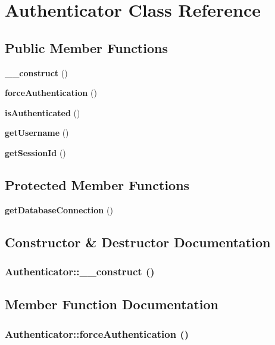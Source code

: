 \section{Authenticator Class Reference}
\label{classAuthenticator}
\subsection*{Public Member Functions}
\begin{CompactItemize}
\item 
{\bf \_\-\_\-construct} ()
\item 
{\bf forceAuthentication} ()
\item 
{\bf isAuthenticated} ()
\item 
{\bf getUsername} ()
\item 
{\bf getSessionId} ()
\end{CompactItemize}
\subsection*{Protected Member Functions}
\begin{CompactItemize}
\item 
{\bf getDatabaseConnection} ()
\end{CompactItemize}


\subsection{Constructor \& Destructor Documentation}
\subsubsection{\setlength{\rightskip}{0pt plus 5cm}Authenticator::\_\-\_\-construct ()}\label{classAuthenticator_8f17ff6ae513a55ee61bb7bb2d81de5c}




\subsection{Member Function Documentation}
\subsubsection{\setlength{\rightskip}{0pt plus 5cm}Authenticator::forceAuthentication ()}\label{classAuthenticator_99831417702758fdce4be1309677890d}



